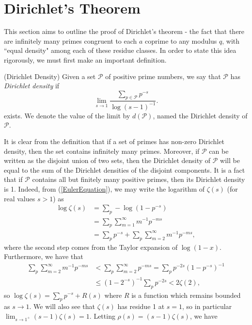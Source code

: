 \section{Dirichlet's Theorem}
This section aims to outline the proof of Dirichlet's theorem - the fact that there are infinitely many primes congruent to each $a$ coprime to any modulus $q$, with ``equal density" among each of these residue classes. In order to state this idea rigorously, we must first make an important definition. 
\begin{definition}
(Dirichlet Density) Given a set $\mathcal{P}$ of positive prime numbers, we say that $\mathcal{P}$ has \textit{Dirichlet density} if
\begin{equation}
   \lim_{s \rightarrow 1}\frac{\sum_{p \in \mathcal{P}}p^{-s}}{\log (s - 1)^{-1}}. \nonumber
\end{equation}
exists. We denote the value of the limit by $d(\mathcal{P})$, named the Dirichlet density of $\mathcal{P}$.
\end{definition}
It is clear from the definition that if a set of primes has non-zero Dirichlet density, then the set contains infinitely many primes. Moreover, if $\mathcal{P}$ can be written as the disjoint union of two sets, then the Dirichlet density of $\mathcal{P}$ will be equal to the sum of the Dirichlet densities of the disjoint components. It is a fact that if $\mathcal{P}$ contains all but finitely many positive primes, then its Dirichlet density is 1. Indeed, from (\ref{EulerEquation}), we may write the logarithm of $\zeta(s)$ (for real values $s > 1$) as 
\begin{align}
\label{logZeta}
    \log \zeta(s) &= \sum_{p} -\log(1 - p^{-s}) \nonumber \\
    &= \sum_{p} \sum_{m=1}^{\infty} m^{-1} p^{-ms} \nonumber \\
    &= \sum_{p} p^{-s} + \sum_{p} \sum_{m=2}^{\infty} m^{-1} p^{-ms}, 
\end{align}
where the second step comes from the Taylor expansion of $\log(1 - x)$. Furthermore, we have that 
\begin{align}
    \sum_{p}\sum_{m=2}^{\infty}m^{-1}p^{-ms} &< \sum_{p}\sum_{m=2}^{\infty}p^{-ms}
    = \sum_{p}p^{-2s}(1 - p^{-s})^{-1} \nonumber \\
    &\leq (1 - 2^{-s})^{-1}\sum_{p}p^{-2s} < 2\zeta(2), \nonumber
\end{align}
so $\log \zeta(s) = \sum_{p} p^{-s} + R(s)$ where $R$ is a function which remains bounded as $s \rightarrow 1$. We will also see that $\zeta(s)$ has residue 1 at $s = 1$, so in particular $\lim_{s \rightarrow 1^{+}}(s-1)\zeta(s) = 1$. Letting $\rho(s) = (s-1)\zeta(s)$, we have
